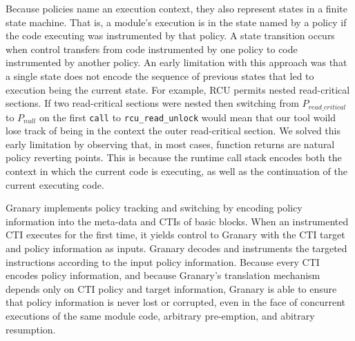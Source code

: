 \documentclass[preprint]{sigplanconf}
\begin{document}
Because policies name an execution context, they also represent states in a finite state machine. That is, a module's execution is in the state named by a policy if the code executing was instrumented by that policy. A state transition occurs when control transfers from code instrumented by one policy to code instrumented by another policy. An early limitation with this approach was that a single state does not encode the sequence of previous states that led to execution being the current state. For example, RCU permits nested read-critical sections. If two read-critical sections were nested then switching from $P_{read\_critical}$ to $P_{null}$ on the first \texttt{call} to \texttt{rcu\_read\_unlock} would mean that our tool woild lose track of being in the context the outer read-critical section. We solved this early limitation by observing that, in most cases, function returns are natural policy reverting points. This is because the runtime call stack encodes both the context in which the current code is executing, as well as the continuation of the current executing code.

Granary implements policy tracking and switching by encoding policy information into the meta-data and CTIs of basic blocks. When an instrumented CTI executes for the first time, it yields control to Granary with the CTI target and policy information as inputs. Granary decodes and instruments the targeted instructions according to the input policy information. Because every CTI encodes policy information, and because Granary's translation mechanism depends only on CTI policy and target information, Granary is able to ensure that policy information is never lost or corrupted, even in the face of concurrent executions of the same module code, arbitrary pre-emption, and abitrary resumption.

\end{document}
